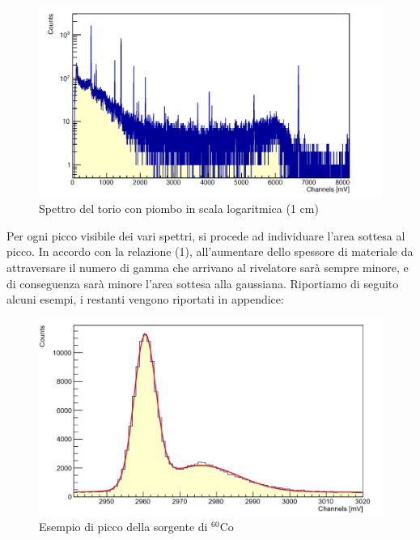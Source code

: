 \documentclass[a4paper,10pt]{article}
\begin{document}
\newpage

\begin{figure}[!h]
    \centering
    \includegraphics[scale=0.4]{img/toriopiombo}
    \caption{Spettro del torio con piombo in scala logaritmica (1 cm)}
\end{figure}

\noindent Per ogni picco visibile dei vari spettri, si procede ad individuare l'area sottesa al picco.  In accordo con la relazione (1), all'aumentare dello spessore di materiale da attraversare il numero di gamma che arrivano al rivelatore sar\`a sempre minore, e di conseguenza sar\`a minore l'area sottesa alla gaussiana. Riportiamo di seguito alcuni esempi, i restanti vengono riportati in appendice:

\begin{figure}[!h]
    \centering
    \includegraphics[scale=0.6]{grafici/piccocobalto}
    \caption{Esempio di picco della sorgente di ${}^{60}$Co}
\end{figure}
\end{document}
